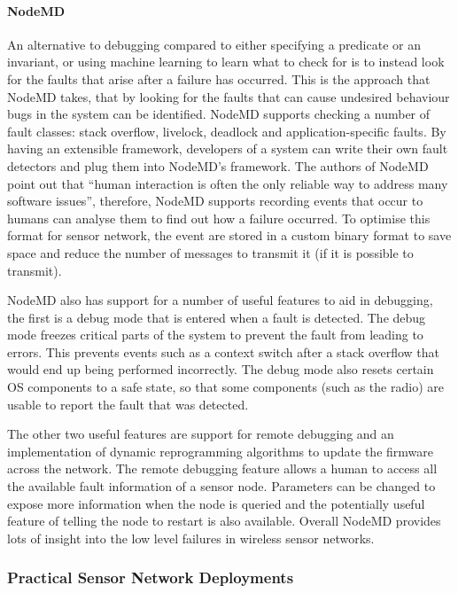 \paragraph{NodeMD} An alternative to debugging compared to either specifying a predicate or an invariant, or using machine learning to learn what to check for is to instead look for the faults that arise after a failure has occurred. This is the approach that NodeMD \cite{NodeMD} takes, that by looking for the faults that can cause undesired behaviour bugs in the system can be identified. NodeMD supports checking a number of fault classes: stack overflow, livelock, deadlock and application-specific faults. By having an extensible framework, developers of a system can write their own fault detectors and plug them into NodeMD's framework. The authors of NodeMD point out that ``human interaction is often the only reliable way to address many software issues'', therefore, NodeMD supports recording events that occur to humans can analyse them to find out how a failure occurred. To optimise this format for sensor network, the event are stored in a custom binary format to save space and reduce the number of messages to transmit it (if it is possible to transmit).

NodeMD also has support for a number of useful features to aid in debugging, the first is a debug mode that is entered when a fault is detected. The debug mode freezes critical parts of the system to prevent the fault from leading to errors. This prevents events such as a context switch after a stack overflow that would end up being performed incorrectly. The debug mode also resets certain OS components to a safe state, so that some components (such as the radio) are usable to report the fault that was detected.

The other two useful features are support for remote debugging and an implementation of dynamic reprogramming algorithms to update the firmware across the network. The remote debugging feature allows a human to access all the available fault information of a sensor node. Parameters can be changed to expose more information when the node is queried and the potentially useful feature of telling the node to restart is also available. Overall NodeMD provides lots of insight into the low level failures in wireless sensor networks.


\subsubsection{Practical Sensor Network Deployments}

